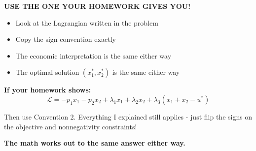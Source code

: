 \documentclass[11pt]{article}
\begin{document}
\textbf{USE THE ONE YOUR HOMEWORK GIVES YOU!}

\begin{itemize}
\item Look at the Lagrangian written in the problem
\item Copy the sign convention exactly
\item The economic interpretation is the same either way
\item The optimal solution $(x_1^*, x_2^*)$ is the same either way
\end{itemize}

\begin{tcolorbox}[colback=yellow!10!white,colframe=orange!75!black,title=Bottom Line]
\textbf{If your homework shows:}
$$\mathcal{L} = -p_1 x_1 - p_2 x_2 + \lambda_1 x_1 + \lambda_2 x_2 + \lambda_3(x_1 + x_2 - u^*)$$

Then use Convention 2. Everything I explained still applies - just flip the signs on the objective and nonnegativity constraints!

\textbf{The math works out to the same answer either way.}
\end{tcolorbox}
\end{document}
